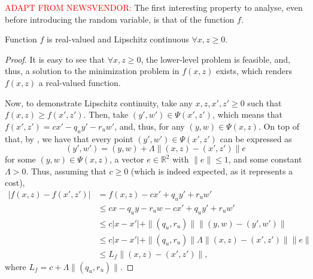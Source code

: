 \documentclass[12pt]{article}
\begin{document}
\textcolor{red}{ADAPT FROM NEWSVENDOR:}
The first interesting property to analyse, even before introducing the random variable, is that of the function $f$.
\begin{lemma}\label{lemma:f-lip-cont}
    Function $f$ is real-valued and Lipschitz continuous $\forall x,z \ge 0$.
\end{lemma}
\begin{proof}
    It is easy to see that $\forall x,z \ge 0$, the lower-level problem is feasible, and, thus, a solution to the minimization problem in $f(x,z)$ exists, which renders $f(x,z)$ a real-valued function.

    Now, to demonstrate Lipschitz continuity, take any $x,z,x',z' \ge 0$ such that $f(x,z)\ge f(x',z')$.
    Then, take $(y',w') \in \Psi(x',z')$, which means that $f(x',z') = cx' - q_uy' -r_uw'$, and, thus, for any $(y,w) \in \Psi(x,z)$.
    On top of that, by \citet[Theorem~4.2]{klatteErrorBoundsSolutions1995}, we have that every point $(y',w')\in \Psi(x',z')$ can be expressed as \[
	(y',w') = (y,w) + \Lambda \| (x,z)-(x',z') \| e
    \] for some $(y,w) \in \Psi(x,z)$, a vector $e \in \mathbb{R}^{2}$ with $\|e\|\le 1$, and some constant $\Lambda > 0$.
    Thus, assuming that $c\ge 0$ (which is indeed expected, as it represents a cost),
    \begin{align*}
	|f(x,z)-f(x',z')| &= f(x,z) - cx' + q_uy' + r_uw' \\
			  &\le cx - q_u y - r_u w  - cx' + q_uy' + r_uw' \\
			  &\le  c |x-x'| + \|(q_u,r_u)\| \|(y,w)-(y',w')\| \\
			  &\le  c |x-x'| + \|(q_u,r_u)\| \Lambda \| (x,z)-(x',z') \| \|e\| \\
			  &\le  L_f \| (x,z)-(x',z') \|
    ,\end{align*}
    where $L_f = c + \Lambda \|(q_u,r_u)\|$.
\end{proof}






% 
\printbibliography
    
\end{document}
